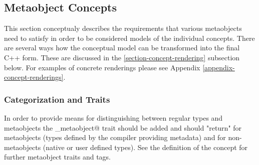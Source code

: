 \subsection{Metaobject Concepts}

This section conceptualy describes the requirements that various metaobjects
need to satisfy in order to be considered models of the individual
concepts. There are several ways how the conceptual model
can be transformed into the final C++ form. These are discussed in the \ref{section-concept-rendering} subsection below.
For examples of concrete renderings please see Appendix \ref{appendix-concept-renderings}.

\subsubsection{Categorization and Traits}

In order to provide means for distinguishing between regular types
and metaobjects the \verb@is_metaobject@ trait should be added
and should "return" \verb@true@ for metaobjects (types defined
by the compiler providing metadata) and \verb@false@
for non-metaobjects (native or user defined types).
See the definition of the {} concept for further 
metaobject traits and tags.


